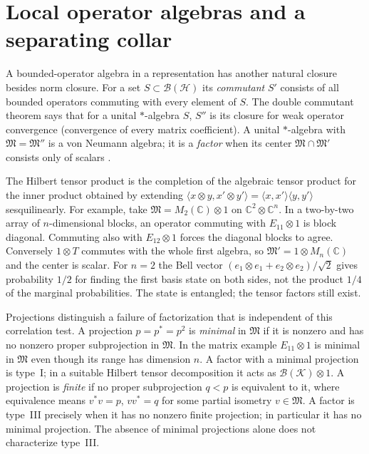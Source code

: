 \section{Local operator algebras and a separating collar}\label{f:local-factors}
A bounded-operator algebra in a representation has another natural closure besides norm closure. For a set $S\subset\mathcal B(\mathcal H)$ its \emph{commutant} $S'$ consists of all bounded operators commuting with every element of $S$. The double commutant theorem says that for a unital $*$-algebra $S$, $S''$ is its closure for weak operator convergence (convergence of every matrix coefficient). A unital $*$-algebra with $\mathfrak M=\mathfrak M''$ is a von Neumann algebra; it is a \emph{factor} when its center $\mathfrak M\cap\mathfrak M'$ consists only of scalars \cite{BR}.

The Hilbert tensor product is the completion of the algebraic tensor product for the inner product obtained by extending $\langle x\otimes y,x'\otimes y'\rangle=\langle x,x'\rangle\langle y,y'\rangle$ sesquilinearly. For example, take $\mathfrak M=M_2(\mathbb C)\otimes 1$ on $\mathbb C^2\otimes\mathbb C^n$. In a two-by-two array of $n$-dimensional blocks, an operator commuting with $E_{11}\otimes1$ is block diagonal. Commuting also with $E_{12}\otimes1$ forces the diagonal blocks to agree. Conversely $1\otimes T$ commutes with the whole first algebra, so $\mathfrak M'=1\otimes M_n(\mathbb C)$ and the center is scalar. For $n=2$ the Bell vector $(e_1\otimes e_1+e_2\otimes e_2)/\sqrt2$ gives probability $1/2$ for finding the first basis state on both sides, not the product $1/4$ of the marginal probabilities. The state is entangled; the tensor factors still exist.

Projections distinguish a failure of factorization that is independent of this correlation test. A projection $p=p^*=p^2$ is \emph{minimal} in $\mathfrak M$ if it is nonzero and has no nonzero proper subprojection in $\mathfrak M$. In the matrix example $E_{11}\otimes1$ is minimal in $\mathfrak M$ even though its range has dimension $n$. A factor with a minimal projection is type~I; in a suitable Hilbert tensor decomposition it acts as $\mathcal B(\mathcal K)\otimes1$. A projection is \emph{finite} if no proper subprojection $q<p$ is equivalent to it, where equivalence means $v^*v=p$, $vv^*=q$ for some partial isometry $v\in\mathfrak M$. A factor is type~III precisely when it has no nonzero finite projection; in particular it has no minimal projection. The absence of minimal projections alone does not characterize type~III.

